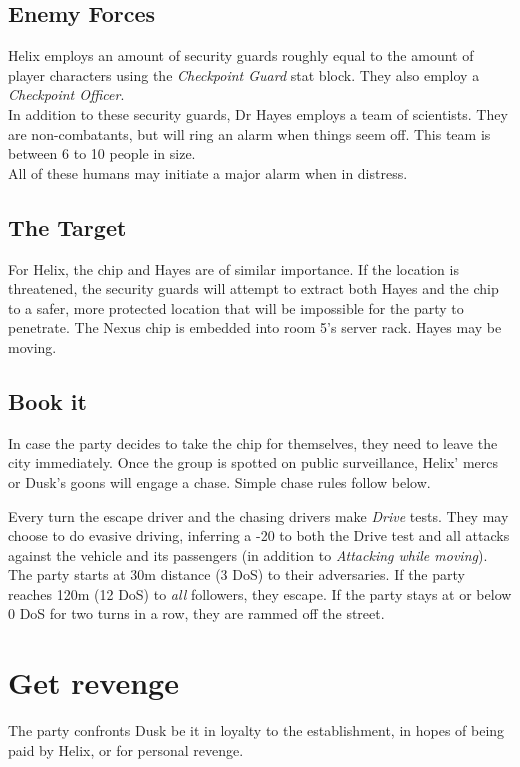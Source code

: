 \subsection*{Enemy Forces}
Helix employs an amount of security guards
	roughly equal to the amount of player characters
	using the \emph{Checkpoint Guard} stat block.
They also employ a \emph{Checkpoint Officer}.
\\%
In addition to these security guards,
	Dr Hayes employs a team of scientists.
They are non-combatants,
	but will ring an alarm
	when things seem off.
This team is between 6 to 10 people in size.
\\%
All of these humans may initiate a major alarm
	when in distress.
\subsection*{The Target}
For Helix, the chip and Hayes are of similar importance.
If the location is threatened,
	the security guards will attempt to extract
	both Hayes and the chip
	to a safer, more protected location that will be impossible for the party to penetrate.
The Nexus chip is embedded into room 5's server rack.
Hayes may be moving.

\subsection{Book it}
\label{sec:flee}
In case the party decides to take the chip for themselves,
	they need to leave the city immediately.
Once the group is spotted on public surveillance,
	Helix' mercs or Dusk's goons
	will engage a chase.
Simple chase rules follow below.
\par
Every turn
	the escape driver and the chasing drivers
	make \emph{Drive} tests.
They may choose to do evasive driving,
	inferring a -20 to both the Drive test
	and all attacks against the vehicle and its passengers
	(in addition to \emph{Attacking while moving}).
\\%
The party starts at 30m distance (3 DoS) to their adversaries.
If the party reaches 120m (12 DoS) to \emph{all} followers,
	they escape.
If the party stays at or below 0 DoS for two turns in a row,
	they are rammed off the street.

\section{Get revenge}
\label{sec:revenge}
The party confronts Dusk 
	be it
	in loyalty to the establishment,
	in hopes of being paid by Helix,
	or for personal revenge.
